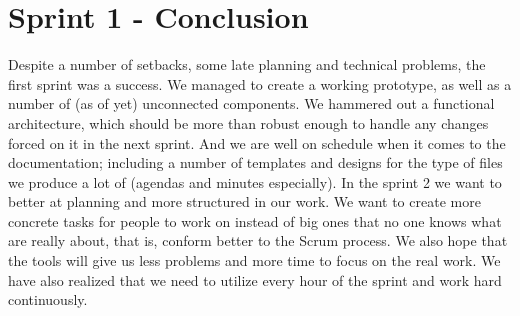 \section{Sprint 1 - Conclusion}

Despite a number of setbacks, some late planning and technical problems, the first sprint was a success. We managed to create a working prototype, as well as a number of (as of yet) unconnected components. We hammered out a functional architecture, which should be more than robust enough to handle any changes forced on it in the next sprint. And we are well on schedule when it comes to the documentation; including a number of templates and designs for the type of files we produce a lot of (agendas and minutes especially). 
\newline
\newline
In the sprint 2 we want to better at planning and more structured in our work. We want to create more concrete tasks for people to work on instead of big ones that no one knows what are really about, that is, conform better to the Scrum process. We also hope that the tools will give us less problems and more time to focus on the real work. We have also realized that we need to utilize every hour of the sprint and work hard continuously.